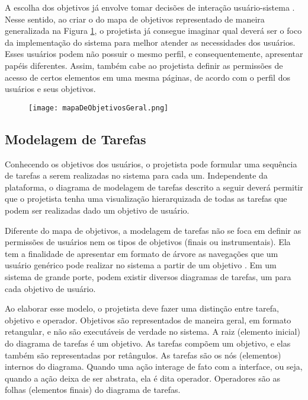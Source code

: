 \indent A escolha dos objetivos já envolve tomar decisões de interação usuário-sistema \cite{IHCbook}. Nesse sentido, ao criar o do mapa de objetivos representado de maneira generalizada na Figura \ref{fig:mapaDeObjetivosGeral}, o projetista já consegue imaginar qual deverá ser o foco da implementação do sistema para melhor atender as necessidades dos usuários. Esses usuários podem não possuir o mesmo perfil, e consequentemente, apresentar papéis diferentes. Assim, também cabe ao projetista definir as permissões de acesso de certos elementos em uma mesma páginas, de acordo com o perfil dos usuários e seus objetivos.

\begin{figure}[!h]
    \centering
    \texttt{[image: mapaDeObjetivosGeral.png]}
    \caption{}
    \label{fig:mapaDeObjetivosGeral}
\end{figure} 

\subsection{Modelagem de Tarefas}

\indent Conhecendo os objetivos dos usuários, o projetista pode formular uma sequência de tarefas a serem realizadas no sistema para cada um. Independente da plataforma, o diagrama de modelagem de tarefas descrito a seguir deverá permitir que o projetista tenha uma visualização hierarquizada de todas as tarefas que podem ser realizadas dado um objetivo de usuário.

\indent Diferente do mapa de objetivos, a modelagem de tarefas não se foca em definir as permissões de usuários nem os tipos de objetivos (finais ou instrumentais). Ela tem a finalidade de apresentar em formato de árvore as navegações que um usuário genérico pode realizar no sistema a partir de um objetivo \cite{IHCbook}. Em um sistema de grande porte, podem existir diversos diagramas de tarefas, um para cada objetivo de usuário. 

\indent Ao elaborar esse modelo, o projetista deve fazer uma distinção entre tarefa, objetivo e operador. Objetivos são representados de maneira geral, em formato retangular, e não são executáveis de verdade no sistema. A raiz (elemento inicial) do diagrama de tarefas é um objetivo. As tarefas compõem um objetivo, e elas também são representadas por retângulos. As tarefas são os nós (elementos) internos do diagrama. Quando uma ação interage de fato com a interface, ou seja, quando a ação deixa de ser abstrata, ela é dita operador. Operadores são as folhas (elementos finais) do diagrama de tarefas.

